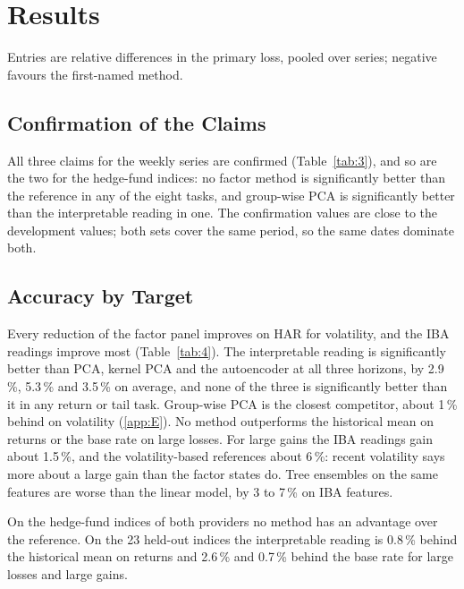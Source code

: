 \documentclass[review]{elsarticle}
\begin{document}
\section{Results}\label{sec:6}

Entries are relative differences in the primary loss, pooled over series; negative favours the first-named method.

\subsection{Confirmation of the Claims}\label{sec:6.1}

All three claims for the weekly series are confirmed (Table~\ref{tab:3}), and so are the two for the hedge-fund indices: no factor method is significantly better than the reference in any of the eight tasks, and group-wise PCA is significantly better than the interpretable reading in one. The confirmation values are close to the development values; both sets cover the same period, so the same dates dominate both.



\subsection{Accuracy by Target}\label{sec:6.2}



Every reduction of the factor panel improves on HAR for volatility, and the IBA readings improve most (Table~\ref{tab:4}). The interpretable reading is significantly better than PCA, kernel PCA and the autoencoder at all three horizons, by 2.9\,\%, 5.3\,\% and 3.5\,\% on average, and none of the three is significantly better than it in any return or tail task. Group-wise PCA is the closest competitor, about 1\,\% behind on volatility (\ref{app:E}). No method outperforms the historical mean on returns or the base rate on large losses. For large gains the IBA readings gain about 1.5\,\%, and the volatility-based references about 6\,\%: recent volatility says more about a large gain than the factor states do. Tree ensembles on the same features are worse than the linear model, by 3 to 7\,\% on IBA features.

On the hedge-fund indices of both providers no method has an advantage over the reference. On the 23 held-out indices the interpretable reading is 0.8\,\% behind the historical mean on returns and 2.6\,\% and 0.7\,\% behind the base rate for large losses and large gains.
\end{document}

